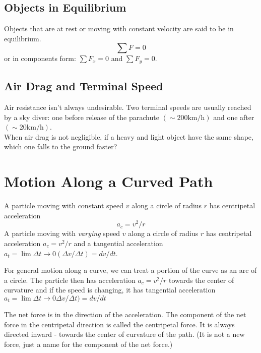 \documentclass[11pt,a4paper]{report}
\begin{document}
\subsection{Objects in Equilibrium} Objects that are at rest or moving with constant velocity are said to be in equilibrium. $$\sum F = 0$$ or in components form: $\sum F_x = 0$ and $\sum F_y = 0$.

\subsection{Air Drag and Terminal Speed} Air resistance isn't always undesirable.
Two terminal speeds are usually reached by a sky diver: one before release of the parachute $\left(\sim 200 \mathrm{ km/h}\right)$ and one after $\left(\sim 20 \mathrm{ km/h}\right)$.
\\When air drag is not negligible, if a heavy and light object have the same shape, which one falls to the ground faster?

\section{Motion Along a Curved Path}
A particle moving with constant speed $v$ along a circle of radius $r$ has centripetal acceleration $$a_c = v^2/r$$
A particle moving with \textit{varying} speed $v$ along a circle of radius $r$ has centripetal acceleration $a_c = v^2/r$ and a tangential acceleration $a_t = \lim{\Delta{t} \to 0} (\Delta{v}/\Delta{t}) = dv/dt$.

\hspace{1mm}

\noindent
For general motion along a curve, we can treat a portion of the curve as an arc of a circle. The particle then has acceleration $a_c = v^2/r$ towards the center of curvature and if the speed is changing, it has tangential acceleration $a_t = \lim{\Delta{t} \to 0} \Delta{v}/\Delta{t}) = dv/dt$


\hspace{1mm}

\noindent
The net force is in the direction of the acceleration. The component of the net force in the centripetal direction is called the centripetal force. It is always directed inward - towards the center of curvature of the path. (It is not a new force, just a name for the component of the net force.)
\end{document}
